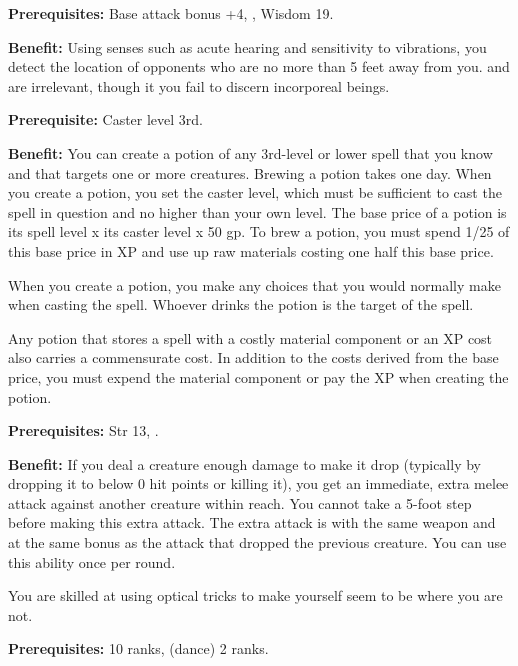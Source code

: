 
\textbf{Prerequisites:} Base attack bonus +4, , Wisdom 19.

\textbf{Benefit:} Using senses such as acute hearing and sensitivity to vibrations, you 
detect the location of opponents who are no more than 5 feet away from you.
 and  are irrelevant, though it you fail to
discern incorporeal beings.


\textbf{Prerequisite:} Caster level 3rd.

\textbf{Benefit:} You can create a potion of any 3rd-level or lower spell that 
you know and that targets one or more creatures. Brewing a potion takes one day. 
When you create a potion, you set the caster level, which must be sufficient to 
cast the spell in question and no higher than your own level. The base price of 
a potion is its spell level x its caster level x 50 gp. To brew a potion, 
you must spend 1/25 of this base price in XP and use up raw materials costing one 
half this base price.

When you create a potion, you make any choices that you would normally make when 
casting the spell. Whoever drinks the potion is the target of the spell.

Any potion that stores a spell with a costly material component or an XP cost also 
carries a commensurate cost. In addition to the costs derived from the base price, 
you must expend the material component or pay the XP when creating the potion.


\textbf{Prerequisites:} Str 13, .

\textbf{Benefit:} If you deal a creature enough damage to make it drop (typically 
by dropping it to below 0 hit points or killing it), you get an immediate, extra 
melee attack against another creature within reach. You cannot take a 5-foot step 
before making this extra attack. The extra attack is with the same weapon and at 
the same bonus as the attack that dropped the previous creature. You can use this 
ability once per round.


You are skilled at using optical tricks to make yourself seem to be where you are 
not.

\textbf{Prerequisites:}  10 ranks,  (dance) 2 ranks.

